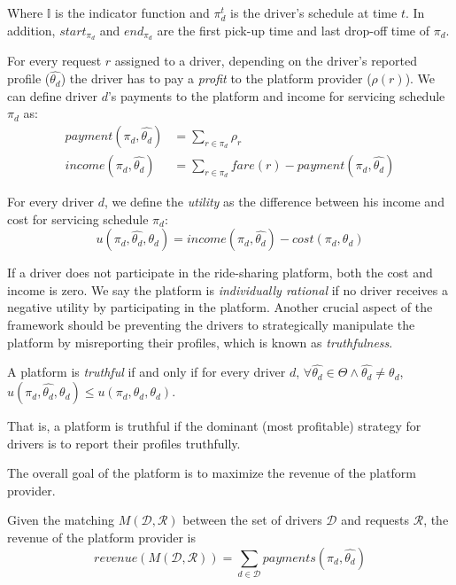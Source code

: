 \noindent Where $\mathbb{I}$ is the indicator function and $\pi_d^t$ is the driver's schedule at time $t$. In addition, $start_{\pi_d}$ and $end_{\pi_d}$ are the first pick-up time and last drop-off time of $\pi_d$.

For every request $r$ assigned to a driver, depending on the driver's reported profile ($\hat{\theta_d}$) the driver has to pay a \emph{profit} to the platform provider ($\rho(r)$). We can define driver $d$'s payments to the platform and income for servicing schedule $\pi_d$ as:
\begin{align}
\label{eq:income}
payment(\pi_d, \hat{\theta_d}) &= \sum_{r \in \pi_d} \rho_r\\
income(\pi_d, \hat{\theta_d}) &= \sum_{r \in \pi_d} fare(r) - payment(\pi_d, \hat{\theta_d})
\end{align}

For every driver $d$, we define the \emph{utility} as the difference between his income and cost for servicing schedule $\pi_d$:
\begin{equation}
u(\pi_d, \hat{\theta_d}, \theta_d) = income(\pi_d, \hat{\theta_d}) - cost(\pi_d, \theta_d)
\end{equation}

If a driver does not participate in the ride-sharing platform, both the cost and income is zero. We say the platform is \emph{individually rational} if no driver receives a negative utility by participating in the platform. Another crucial aspect of the framework should be preventing the drivers to strategically manipulate the platform by misreporting their profiles, which is known as \emph{truthfulness}.

\begin{definition} [Truthfulness]
A platform is \emph{truthful} if and only if for every driver $d$, $\forall \hat{\theta_d} \in \Theta \land \hat{\theta_d} \neq \theta_d$, $u(\pi_d, \hat{\theta_d}, \theta_d) \leq u(\pi_d, \theta_d, \theta_d)$.
\end{definition}

\noindent That is, a platform is truthful if the dominant (most profitable) strategy for drivers is to report their profiles truthfully.

The overall goal of the platform is to maximize the revenue of the platform provider.

\begin{definition} [Revenue]
Given the matching $M(\mathcal{D}, \mathcal{R})$ between the set of drivers $\mathcal{D}$ and requests $\mathcal{R}$, the revenue of the platform provider is
\begin{equation}
revenue(M(\mathcal{D}, \mathcal{R})) = \sum_{d \in \mathcal{D}} payments(\pi_d, \hat{\theta_d})
\end{equation}
\end{definition}

